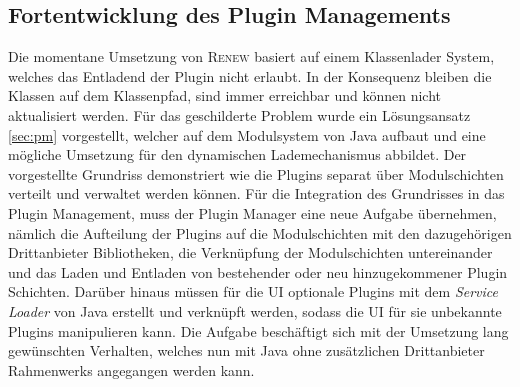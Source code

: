  \subsection*{Fortentwicklung des Plugin Managements}
	Die momentane Umsetzung von \textsc{Renew} basiert auf einem Klassenlader System, welches das Entladend der Plugin nicht erlaubt. In der Konsequenz bleiben die Klassen auf dem Klassenpfad, sind immer erreichbar und können nicht aktualisiert werden. Für das geschilderte Problem wurde ein Lösungsansatz \ref{sec:pm} vorgestellt, welcher auf dem Modulsystem von Java aufbaut und eine mögliche Umsetzung für den dynamischen Lademechanismus abbildet. Der vorgestellte Grundriss demonstriert wie die Plugins separat über Modulschichten verteilt und verwaltet werden können.\newline
	Für die Integration des Grundrisses in das Plugin Management, muss der Plugin Manager eine neue Aufgabe übernehmen, nämlich die Aufteilung der Plugins auf die Modulschichten mit den dazugehörigen Drittanbieter Bibliotheken, die Verknüpfung der Modulschichten untereinander und das Laden und Entladen von bestehender oder neu hinzugekommener Plugin Schichten. Darüber hinaus müssen für die UI optionale Plugins mit dem \textit{Service Loader} von Java erstellt und verknüpft werden, sodass die UI für sie unbekannte Plugins manipulieren kann. \newline
	Die Aufgabe beschäftigt sich mit der Umsetzung lang gewünschten Verhalten, welches nun mit Java ohne zusätzlichen Drittanbieter Rahmenwerks angegangen werden kann. 






